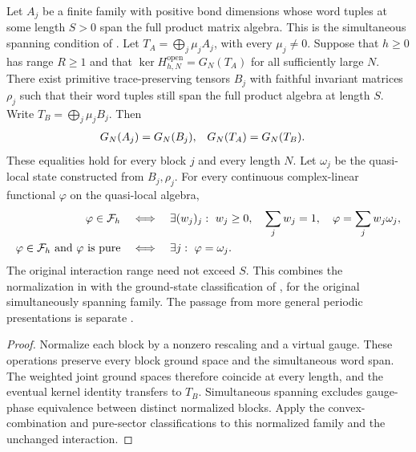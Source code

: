 \begin{lemma}
    \label{thm:normalized_quasi_local_ground_state_classification}
    \leanok
    Let $A_j$ be a finite family with positive bond dimensions whose
    word tuples at some length $S>0$ span the full product matrix algebra.
    This is the simultaneous spanning condition of
    \cite[Section~IV.C]{Cirac2021Matrix}.
    Let $T_A=\bigoplus_j\mu_jA_j$, with every $\mu_j\ne0$.
    Suppose that $h\geq0$ has range $R\geq1$ and that
    $\ker H^{\mathrm{open}}_{h,N}=G_N(T_A)$ for all sufficiently large $N$.
    There exist primitive trace-preserving tensors $B_j$ with faithful
    invariant matrices $\rho_j$ such that their word tuples still span the
    full product algebra at length $S$. Write $T_B=\bigoplus_j\mu_jB_j$. Then
    \begin{align}
        G_N(A_j) & =G_N(B_j), &
        G_N(T_A) & =G_N(T_B).
        \notag
    \end{align}
    These equalities hold for every block $j$ and every length $N$.
    Let $\omega_j$ be the quasi-local state constructed from $B_j,\rho_j$.
    For every continuous complex-linear functional $\varphi$ on the
    quasi-local algebra,
    \begin{align}
        \varphi\in\mathcal F_h
         & \quad\Longleftrightarrow\quad
        \exists (w_j)_j:\ w_j\geq0,\quad\sum_jw_j=1,\quad
        \varphi=\sum_jw_j\omega_j,\notag \\
        \varphi\in\mathcal F_h\ \text{and }\varphi\text{ is pure}
         & \quad\Longleftrightarrow\quad
        \exists j:\ \varphi=\omega_j.\notag
    \end{align}
    The original interaction range need not exceed $S$.
    This combines the normalization in
    \cite[equations~(3.1)--(3.2b)]{Nachtergaele1996Spectral}
    with the ground-state classification of
    \cite[Theorems~1.1--1.2]{Nachtergaele1996Spectral}, for the original
    simultaneously spanning family. The passage from more general periodic
    presentations is separate
    \cite{gap:nachtergaele96_infinite_volume_ground_projection}.
\end{lemma}
\begin{proof}\leanok
    Normalize each block by a nonzero rescaling and a virtual gauge.
    These operations preserve every block ground space and the simultaneous
    word span. The weighted joint ground spaces therefore coincide at every
    length, and the eventual kernel identity transfers to $T_B$.
    Simultaneous spanning excludes gauge-phase equivalence between distinct
    normalized blocks. Apply the convex-combination and pure-sector
    classifications to this normalized family and the unchanged interaction.
\end{proof}

